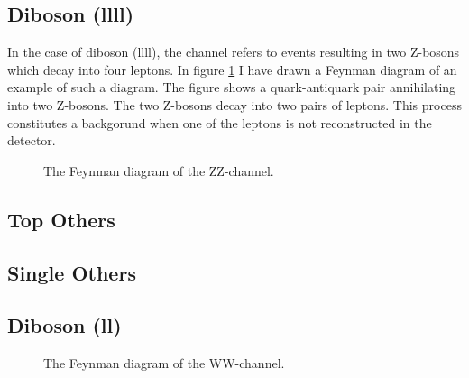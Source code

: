\subsection{Diboson (llll)}
In the case of diboson (llll), the channel refers to events resulting in two Z-bosons which decay 
into four leptons. In figure \ref{fig:zz} I have drawn a Feynman diagram of an example of 
such a diagram. The figure shows a quark-antiquark pair annihilating into two Z-bosons.
The two Z-bosons decay into two pairs of leptons. This process constitutes a backgorund when one 
of the leptons is not reconstructed in the detector.
\begin{figure}
    \centering
    \caption{The Feynman diagram of the ZZ-channel.}
    \label{fig:zz}
\end{figure}



\subsection{Top Others}
\subsection{Single Others}
\subsection{Diboson (ll)}
\begin{figure}
    \centering
    \caption{The Feynman diagram of the WW-channel.}
    \label{fig:ww}
\end{figure}
